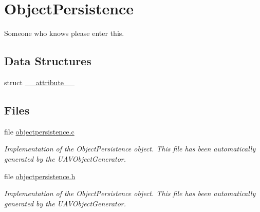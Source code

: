 \hypertarget{group___object_persistence}{\section{\-Object\-Persistence}
\label{group___object_persistence}
}


\-Someone who knows please enter this.  


\subsection*{\-Data \-Structures}
\begin{DoxyCompactItemize}
\item 
struct \hyperlink{struct____attribute____}{\-\_\-\-\_\-attribute\-\_\-\-\_\-}
\end{DoxyCompactItemize}
\subsection*{\-Files}
\begin{DoxyCompactItemize}
\item 
file \hyperlink{objectpersistence_8c}{objectpersistence.\-c}
\begin{DoxyCompactList}\small\item\em \-Implementation of the \-Object\-Persistence object. \-This file has been automatically generated by the \-U\-A\-V\-Object\-Generator. \end{DoxyCompactList}\item 
file \hyperlink{objectpersistence_8h}{objectpersistence.\-h}
\begin{DoxyCompactList}\small\item\em \-Implementation of the \-Object\-Persistence object. \-This file has been automatically generated by the \-U\-A\-V\-Object\-Generator. \end{DoxyCompactList}\end{DoxyCompactItemize}
